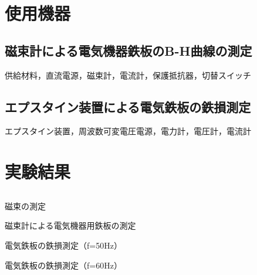 \section{使用機器}
\subsection{磁束計による電気機器鉄板のB-H曲線の測定}
供給材料，直流電源，磁束計，電流計，保護抵抗器，切替スイッチ

\subsection{エプスタイン装置による電気鉄板の鉄損測定}
エプスタイン装置，周波数可変電圧電源，電力計，電圧計，電流計

\newpage
\section{実験結果}
\subsection{}
\begin{landscape}
  \begin{table}[htbp]
    \centering
    \small
    \caption{磁束の測定}
    \scalebox{0.61} {
      
    }
  \end{table}
\end{landscape}

\begin{table}[htbp]
  \centering
  \caption{磁束計による電気機器用鉄板の測定}
  
\end{table}

\begin{table}[htbp]
  \centering
  \caption{電気鉄板の鉄損測定（f=50Hz）}
  \scalebox{0.61} {
    
  }
\end{table}

\begin{table}[htbp]
  \centering
  \caption{電気鉄板の鉄損測定（f=60Hz）}
  \scalebox{0.61} {
    
  }
\end{table}



